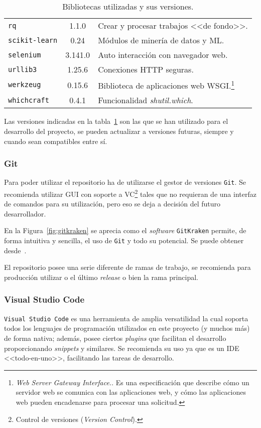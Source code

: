 \begin{table}[p]
\begin{tabular}{lcl}
	\texttt{rq} & 1.1.0 & Crear y procesar trabajos <<de fondo>>.\\ \rowcolor[HTML]{EFEFEF}
	\texttt{scikit-learn} & 0.24 & Módulos de minería de datos y ML.\\ 
	\texttt{selenium} & 3.141.0 & Auto interacción con navegador web.\\ \rowcolor[HTML]{EFEFEF}
	\texttt{urllib3} & 1.25.6 & Conexiones HTTP seguras.\\
	\texttt{werkzeug} & 0.15.6 & Biblioteca de aplicaciones web WSGI.\footnote{\textit{Web Server Gateway Interface.}. Es una especificación que describe cómo un servidor web se comunica con las aplicaciones web, y cómo las aplicaciones web pueden encadenarse para procesar una solicitud.}\\ \rowcolor[HTML]{EFEFEF}
	\texttt{whichcraft} & 0.4.1 & Funcionalidad \textit{shutil.which}. \\
	\bottomrule
\end{tabular}
\caption{Bibliotecas utilizadas y sus versiones.}\label{tab:bibliotecas-python-ubumlaas}
\end{table}

Las versiones indicadas en la tabla~\ref{tab:bibliotecas-python-ubumlaas} son las que se han utilizado para el desarrollo del proyecto, se pueden actualizar a versiones futuras, siempre y cuando sean compatibles entre sí.

\subsubsection{Git}
Para poder utilizar el repositorio ha de utilizarse el gestor de versiones \texttt{Git}. Se recomienda utilizar GUI con soporte a VC\footnote{Control de versiones (\textit{Version Control}).} tales que no requieran de una interfaz de comandos para su utilización, pero eso se deja a decisión del futuro desarrollador.

En la Figura~\ref{fig:gitkraken} se aprecia como el \textit{software} \texttt{GitKraken} permite, de forma intuitiva y sencilla, el uso de \texttt{Git} y todo su potencial. Se puede obtener desde~\cite{gitkraken}.

El repositorio posee una serie diferente de ramas de trabajo, se recomienda para producción utilizar o el último \textit{release} o bien la rama principal.

\subsubsection{Visual Studio Code}
\texttt{Visual Studio Code} es una herramienta de amplia versatilidad la cual soporta todos los lenguajes de programación utilizados en este proyecto (y muchos más) de forma nativa; además, posee ciertos \textit{plugins} que facilitan el desarrollo proporcionando \textit{snippets} y similares. Se recomienda su uso ya que es un IDE <<todo-en-uno>>, facilitando las tareas de desarrollo. 

